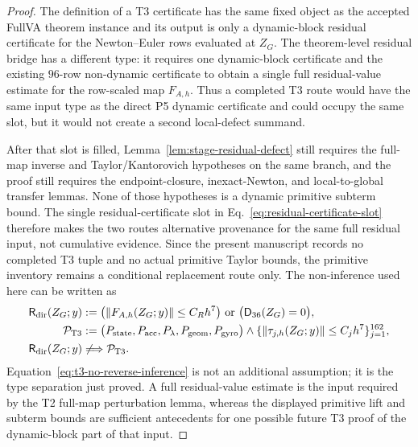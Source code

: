 \documentclass[preprint,12pt]{elsarticle}
\begin{document}
\begin{proof}
The definition of a T3 certificate has the same fixed object as the accepted
FullVA theorem instance and its output is only a dynamic-block residual
certificate for the Newton--Euler rows evaluated at \(Z_G\).  The theorem-level
residual bridge has a different type: it requires one dynamic-block
certificate and the existing \(96\)-row non-dynamic certificate to obtain a
single full residual-value estimate for the row-scaled map \(F_{A,h}\).  Thus
a completed T3 route would have the same input type as the direct P5 dynamic
certificate and could occupy the same slot, but it would not create a second
local-defect summand.

After that slot is filled, Lemma~\ref{lem:stage-residual-defect} still
requires the full-map inverse and Taylor/Kantorovich hypotheses on the same
branch, and the proof still requires the endpoint-closure, inexact-Newton,
and local-to-global transfer lemmas.  None of those hypotheses is a dynamic
primitive subterm bound.  The single residual-certificate slot in
Eq.~\eqref{eq:residual-certificate-slot} therefore makes the two routes
alternative provenance for the same full residual input, not cumulative
evidence.  Since the present manuscript records no completed T3 tuple and no
actual primitive Taylor bounds, the primitive inventory remains a conditional
replacement route only.
The non-inference used here can be written as
\begin{equation}
\label{eq:t3-no-reverse-inference}
  \begin{aligned}
  \mathsf R_{\rm dir}(Z_G;y)
  &:=
  \bigl(\|F_{A,h}(Z_G;y)\|\le C_Rh^7\bigr)
  \ \hbox{or}\ \bigl(\mathsf D_{36}(Z_G)=0\bigr),\\
  \mathcal P_{\rm T3}
  &:=
  \bigl(P_{\mathrm{state}},P_{\mathrm{acc}},P_{\lambda},
  P_{\mathrm{geom}},P_{\mathrm{gyro}}\bigr)
  \wedge
  \{\|\tau_{j,h}(Z_G;y)\|\le C_jh^7\}_{j=1}^{162},\\
  \mathsf R_{\rm dir}(Z_G;y)&\not\Longrightarrow \mathcal P_{\rm T3}.
  \end{aligned}
\end{equation}
Equation~\eqref{eq:t3-no-reverse-inference} is not an additional assumption;
it is the type separation just proved.  A full residual-value estimate is the
input required by the T2 full-map perturbation lemma, whereas the displayed
primitive lift and subterm bounds are sufficient antecedents for one possible
future T3 proof of the dynamic-block part of that input.
\end{proof}
\end{document}
